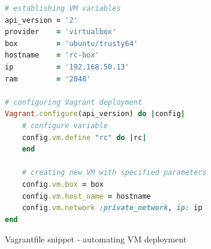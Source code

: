 \documentclass{llncs}
\begin{document}
\begin{figure}
\begin{lstlisting}[language=Ruby]
# establishing VM variables
api_version = '2'
provider    = 'virtualbox'
box         = 'ubuntu/trusty64'
hostname    = 'rc-box'
ip          = '192.168.50.13'
ram         = '2048'

# configuring Vagrant deployment
Vagrant.configure(api_version) do |config|
  	# configure variable
  	config.vm.define "rc" do |rc|
	end

	# creating new VM with specified parameters
	config.vm.box = box
	config.vm.host_name = hostname
	config.vm.network :private_network, ip: ip
end
\end{lstlisting}
	\centering
	\caption{Vagrantfile snippet - automating VM deployment}
\end{figure}
\end{document}

